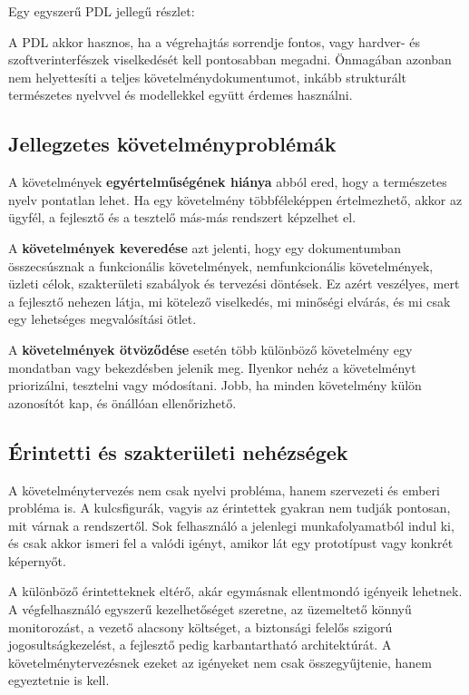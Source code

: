 Egy egyszerű PDL jellegű részlet:


A PDL akkor hasznos, ha a végrehajtás sorrendje fontos, vagy hardver- és szoftverinterfészek viselkedését kell pontosabban megadni. Önmagában azonban nem helyettesíti a teljes követelménydokumentumot, inkább strukturált természetes nyelvvel és modellekkel együtt érdemes használni.

\subsection{Jellegzetes követelményproblémák}

\begin{center}

\end{center}

A követelmények \textbf{egyértelműségének hiánya} abból ered, hogy a természetes nyelv pontatlan lehet. Ha egy követelmény többféleképpen értelmezhető, akkor az ügyfél, a fejlesztő és a tesztelő más-más rendszert képzelhet el.

A \textbf{követelmények keveredése} azt jelenti, hogy egy dokumentumban összecsúsznak a funkcionális követelmények, nemfunkcionális követelmények, üzleti célok, szakterületi szabályok és tervezési döntések. Ez azért veszélyes, mert a fejlesztő nehezen látja, mi kötelező viselkedés, mi minőségi elvárás, és mi csak egy lehetséges megvalósítási ötlet.

A \textbf{követelmények ötvöződése} esetén több különböző követelmény egy mondatban vagy bekezdésben jelenik meg. Ilyenkor nehéz a követelményt priorizálni, tesztelni vagy módosítani. Jobb, ha minden követelmény külön azonosítót kap, és önállóan ellenőrizhető.

\subsection{Érintetti és szakterületi nehézségek}

A követelménytervezés nem csak nyelvi probléma, hanem szervezeti és emberi probléma is. A kulcsfigurák, vagyis az érintettek gyakran nem tudják pontosan, mit várnak a rendszertől. Sok felhasználó a jelenlegi munkafolyamatból indul ki, és csak akkor ismeri fel a valódi igényt, amikor lát egy prototípust vagy konkrét képernyőt.

A különböző érintetteknek eltérő, akár egymásnak ellentmondó igényeik lehetnek. A végfelhasználó egyszerű kezelhetőséget szeretne, az üzemeltető könnyű monitorozást, a vezető alacsony költséget, a biztonsági felelős szigorú jogosultságkezelést, a fejlesztő pedig karbantartható architektúrát. A követelménytervezésnek ezeket az igényeket nem csak összegyűjtenie, hanem egyeztetnie is kell.

